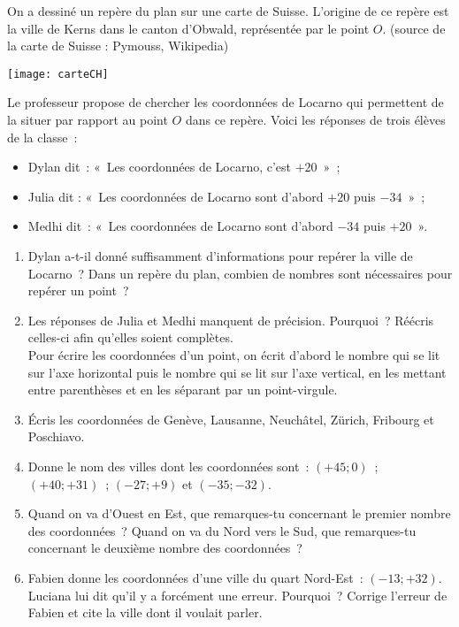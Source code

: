 
\begin{activite}

On a dessiné un repère du plan sur une carte de Suisse. L'origine de ce repère est la ville de Kerns dans le canton d'Obwald, représentée par le point $O$. \scriptsize{(source de la carte de Suisse : Pymouss, Wikipedia)}

\begin{center} \texttt{[image: carteCH]} \end{center}
\normalsize{Le professeur propose de chercher les coordonnées de Locarno qui permettent de la situer par rapport au point $O$ dans ce repère. Voici les réponses de trois élèves de la classe :}
\begin{itemize}
 \item Dylan dit : « Les coordonnées de Locarno, c'est $+ 20$ » ;
 \item Julia dit : « Les coordonnées de Locarno sont d'abord $+ 20$ puis $- 34$ » ;
 \item Medhi dit : « Les coordonnées de Locarno sont d'abord $- 34$ puis $+ 20$ ».
 \end{itemize}
 \begin{enumerate}
  \item Dylan a-t-il donné suffisamment d'informations pour repérer la ville de Locarno ? Dans un repère du plan, combien de nombres sont nécessaires pour repérer un point ?
  \item Les réponses de Julia et Medhi manquent de précision. Pourquoi ? Réécris celles-ci afin qu'elles soient complètes. \\[1em]
Pour écrire les coordonnées d'un point, on écrit d'abord le nombre qui se lit sur l'axe horizontal puis le nombre qui se lit sur l'axe vertical, en les mettant entre parenthèses et en les séparant par un point-virgule.
  \item Écris les coordonnées de Genève, Lausanne, Neuchâtel, Zürich, Fribourg et Poschiavo.
  \item Donne le nom des villes dont les coordonnées sont : $(+ 45 ; 0)$ ; $(+ 40 ; + 31)$ ;­ $(- 27 ; + 9)$ et $(- 35 ; - 32)$.
  \item Quand on va d'Ouest en Est, que remarques-tu concernant le premier nombre des coordonnées ? Quand on va du Nord vers le Sud, que remarques-tu concernant le deuxième nombre des coordonnées ?
  \item Fabien donne les coordonnées d'une ville du quart Nord-Est : $(- 13 ; + 32)$. Luciana lui dit qu'il y a forcément une erreur. Pourquoi ? Corrige l'erreur de Fabien et cite la ville dont il voulait parler.
  \end{enumerate}
  
\end{activite}

